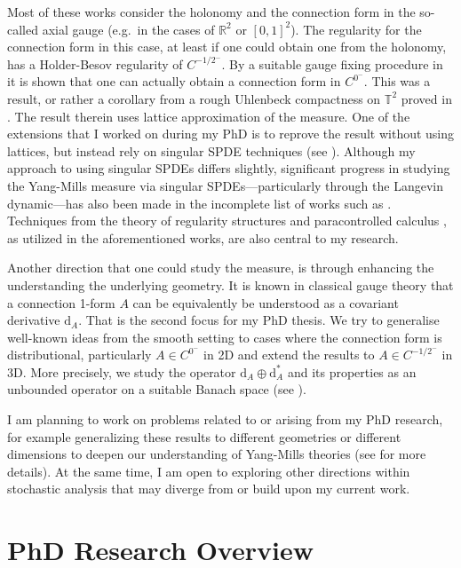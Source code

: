 \documentclass[12pt]{article}
\numberwithin{equation}{section}
\theoremstyle{definition}
\theoremstyle{remark}
\newcommand{\diff}{\mathrm{d}}
\newcommand{\R}{\mathbb R}
\newcommand{\1}{\mathbf 1}
\newcommand{\<}{\langle}
\renewcommand{\>}{\rangle}
\newcommand{\bT}{\mathbb T}
\begin{document}
Most of these works consider the holonomy and the connection form in the so-called axial gauge (e.g.\ in the cases of $\R^2$ or $[0,1]^2$). The regularity for the connection form in this case, at least if one could obtain one from the holonomy, has a Holder-Besov regularity of $C^{-1/2^-}$. By a suitable gauge fixing procedure in \cite{Chevyrev19} it is shown that one can actually obtain a connection form in $C^{0^-}$. This was a result, or rather a corollary from a rough Uhlenbeck compactness on $\bT^2$ proved in \cite{Chevyrev19}. The result therein uses lattice approximation of the measure. One of the extensions that I worked on during my PhD  is to reprove the result without using lattices, but instead rely on singular SPDE techniques (see  ). Although my approach to using singular SPDEs differs slightly, significant progress in studying the Yang-Mills measure via singular SPDEs—particularly through the Langevin dynamic—has also been made in the incomplete list of works such as  \cite{CCHS2d,CCHS3d,CH23,BC23,BC24}. Techniques from the theory of regularity structures \cite{Hairer14} and paracontrolled calculus \cite{GIP15}, as utilized in the aforementioned works, are also central to my research. 



Another direction that one could study the measure, is through enhancing the understanding the underlying geometry. It is known in classical gauge theory that a connection 1-form $A$ can be equivalently be understood as a covariant derivative $\diff_A$. That is the second focus for my PhD thesis. We try to generalise well-known ideas from the smooth setting to cases where the connection form is distributional, particularly $A\in C^{0^-}$ in 2D and extend the results to $A\in C^{-1/2^-}$ in 3D. More precisely, we study the operator $\diff_A\oplus\diff_A^*$ and its properties as an unbounded operator on a suitable Banach space (see ). 

I am planning to work on problems related to or arising from my PhD research, for example generalizing these results to different geometries or different dimensions to deepen our understanding of Yang-Mills theories (see  for more details).  At the same time, I am open to exploring other directions within stochastic analysis that may diverge from or build upon my current work.

\section{PhD Research Overview}
\end{document}
